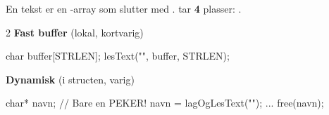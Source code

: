 
\label{kap:tekster}

En tekst er en -array som slutter med .  tar \textbf{4} plasser: .

\begin{multicols}{2}
\textbf{Fast buffer} (lokal, kortvarig)
\begin{kode}
char buffer[STRLEN];
lesText("\tNavn", buffer, STRLEN);
\end{kode}
\columnbreak
\textbf{Dynamisk} (i structen, varig)
\begin{kode}
char* navn;                  //  Bare en PEKER!
navn = lagOgLesText("\tNavn");
...
free(navn);
\end{kode}
\end{multicols}

